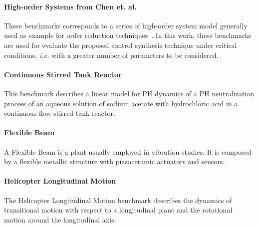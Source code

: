 \documentclass[sigconf]{llncs}
\begin{document}
{%
\paragraph*{High-order Systems from Chen et. al.}

These benchmarks corresponds to a series of high-order system model 
generally used as example for order reduction techniques~\cite{CHEN1979389}.
 In this work, these benchmarks are used for evaluate the proposed control
 synthesis technique under critical conditions, {\it i.e.} with a greater 
 number of parameters to be considered.


\paragraph*{Continuous Stirred Tank Reactor}

This benchmark describes a linear model for PH dynamics of a PH 
neutralization process of an aqueous solution of sodium acetate with 
hydrochloric acid in a continuous flow stirred-tank reactor.

\paragraph*{Flexible Beam}

A Flexible Beam is a plant usually employed in vibration studies. It is 
composed by a flexible metallic structure with piezoceramic actuators 
and sensors.

\paragraph*{Helicopter Longitudinal Motion}

The Helicopter Longitudinal Motion benchmark describes the dynamics of 
transitional motion with respect to a longitudinal plane and the 
rotational motion around the longitudinal axis.

}
\end{document}
